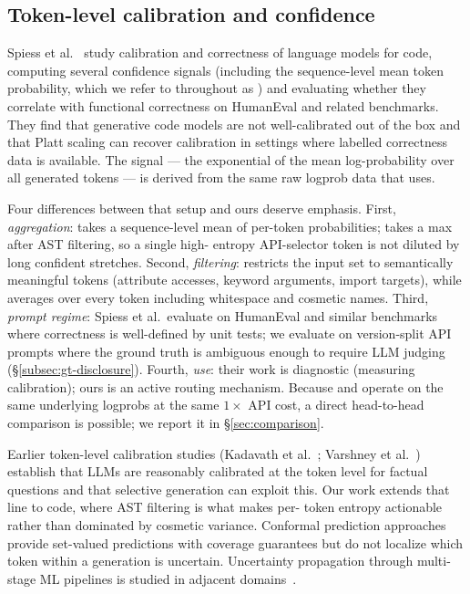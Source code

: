 \subsection{Token-level calibration and confidence}
\label{subsec:related-calibration}

Spiess et al.~\cite{spiess2025calibration} study calibration and
correctness of language models for code, computing several confidence
signals (including the sequence-level mean token probability, which we
refer to throughout as \papg) and evaluating whether they correlate with
functional correctness on HumanEval and related benchmarks. They find
that generative code models are not well-calibrated out of the box and
that Platt scaling can recover calibration in settings where labelled
correctness data is available. The \papg signal --- the exponential of
the mean log-probability over all generated tokens --- is derived from
the same raw logprob data that \eps uses.

Four differences between that setup and ours deserve emphasis. First,
\emph{aggregation}: \papg takes a sequence-level mean of per-token
probabilities; \eps takes a max after AST filtering, so a single high-%
entropy API-selector token is not diluted by long confident stretches.
Second, \emph{filtering}: \eps restricts the input set to semantically
meaningful tokens (attribute accesses, keyword arguments, import
targets), while \papg averages over every token including whitespace and
cosmetic names. Third, \emph{prompt regime}: Spiess et al.\ evaluate on
HumanEval and similar benchmarks where correctness is well-defined by
unit tests; we evaluate on version-split API prompts where the ground
truth is ambiguous enough to require LLM judging
(\S\ref{subsec:gt-disclosure}). Fourth, \emph{use}: their work is
diagnostic (measuring calibration); ours is an active routing
mechanism. Because \papg and \eps operate on the same underlying logprobs
at the same $1\times$ API cost, a direct head-to-head comparison is
possible; we report it in \S\ref{sec:comparison}.

Earlier token-level calibration studies (Kadavath et
al.~\cite{kadavath2022language}; Varshney et al.~\cite{varshney2023stitch})
establish that LLMs are reasonably calibrated at the token level for
factual questions and that selective generation can exploit this. Our
work extends that line to code, where AST filtering is what makes per-%
token entropy actionable rather than dominated by cosmetic variance.
Conformal prediction approaches~\cite{quach2023conformal,
angelopoulos2022conformal} provide set-valued predictions with coverage
guarantees but do not localize which token within a generation is
uncertain. Uncertainty propagation through multi-stage ML pipelines is
studied in adjacent domains~\cite{jungo2020analyzing}.

